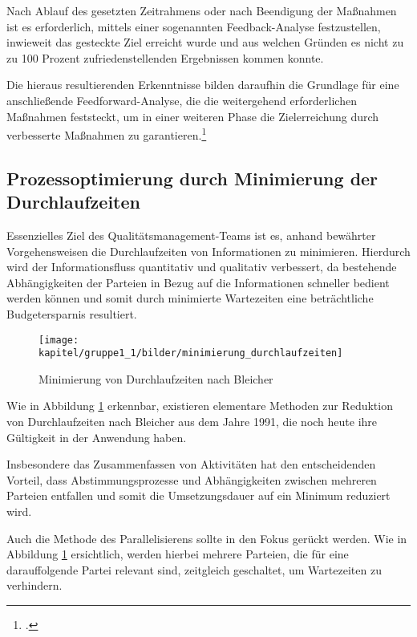 Nach Ablauf des gesetzten Zeitrahmens oder nach Beendigung der Maßnahmen ist es erforderlich, mittels einer sogenannten Feedback-Analyse festzustellen, inwieweit das gesteckte Ziel erreicht wurde und aus welchen Gründen es nicht zu zu 100 Prozent zufriedenstellenden Ergebnissen kommen konnte.

Die hieraus resultierenden Erkenntnisse bilden daraufhin die Grundlage für eine anschließende Feedforward-Analyse, die die weitergehend erforderlichen Maßnahmen feststeckt, um in einer weiteren Phase die Zielerreichung durch verbesserte Maßnahmen zu garantieren.\footcite{gadatsch_it-controlling_2012}

\subsection{Prozessoptimierung durch Minimierung der Durchlaufzeiten}
\label{subsubsection_prozessoptimierung_durch_minierung_der_durchlaufzeiten}
Essenzielles Ziel des Qualitätsmanagement-Teams ist es, anhand bewährter Vorgehensweisen die Durchlaufzeiten von Informationen zu minimieren. 
Hierdurch wird der Informationsfluss quantitativ und qualitativ verbessert, da bestehende Abhängigkeiten der Parteien in Bezug auf die Informationen schneller bedient werden können und somit durch minimierte Wartezeiten eine beträchtliche Budgetersparnis resultiert.

\begin{figure}[h!]
	\centering
	\texttt{[image: kapitel/gruppe1\_1/bilder/minimierung\_durchlaufzeiten]}
	\caption{Minimierung von Durchlaufzeiten nach Bleicher\protect\footnotemark}
	\label{fig_minimierung_durchlaufzeiten}
\end{figure}
\newpage

Wie in Abbildung \ref{fig_minimierung_durchlaufzeiten} erkennbar, existieren elementare Methoden zur Reduktion von Durchlaufzeiten nach Bleicher aus dem Jahre 1991, die noch heute ihre Gültigkeit in der Anwendung haben.

Insbesondere das Zusammenfassen von Aktivitäten hat den entscheidenden Vorteil, dass Abstimmungsprozesse und Abhängigkeiten zwischen mehreren Parteien entfallen und somit die Umsetzungsdauer auf ein Minimum reduziert wird. 

Auch die Methode des Parallelisierens sollte in den Fokus gerückt werden. Wie in Abbildung \ref{fig_minimierung_durchlaufzeiten} ersichtlich, werden hierbei mehrere Parteien, die für eine darauffolgende Partei relevant sind, zeitgleich geschaltet, um Wartezeiten zu verhindern. 

